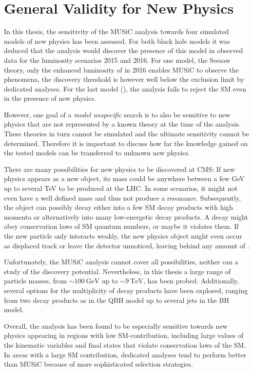 \section{General Validity for New Physics}
In this thesis, the sensitivity of the \ac{MUSiC} analysis towards four simulated models of new physics has been assessed. For both black hole models it was deduced that the analysis would discover the presence of this model in observed data for the luminosity scenarios 2015 and 2016. For one model, the Seesaw theory, only the enhanced luminosity of \lumiB in 2016 enables \ac{MUSiC} to observe the phenomena, the discovery threshold is however well below the exclusion limit by dedicated analyses. For the last model (\PWprime), the analysis fails to reject the \acl{SM} even in the presence of new physics. 

However, one goal of a \emph{model unspecific} search is to also be sensitive to new physics that are not represented by a known theory at the time of the analysis. These theories in turn cannot be simulated and the ultimate sensitivity cannot be determined.
Therefore it is important to discuss how far the knowledge gained on the tested models can be transferred to unknown new physics.

There are many possibilities for new physics to be discovered at \ac{CMS}: If new physics appears as a new object, its mass could be anywhere between a few \si{\GeV} up to several \si{\TeV} to be produced at the \ac{LHC}. In some scenarios, it might not even have a well defined mass and thus not produce a resonance. Subsequently, the object can possibly decay either into a few \ac{SM} decay products with high momenta or alternatively into many low-energetic decay products. A decay might obey conservation laws of \ac{SM} quantum numbers, or maybe it violates them. If the new particle only interacts weakly, the new physics object might even occur as displaced track or leave the detector unnoticed, leaving behind any amount of \MET.

Unfortunately, the \ac{MUSiC} analysis cannot cover all possibilities, neither can a study of the discovery potential.
Nevertheless, in this thesis a large range of particle masses, from $\sim \SI{100}{\GeV}$ up to $\sim \SI{9}{\TeV}$, has been probed. Additionally, several options for the multiplicity of decay products have been explored, ranging from two decay products as in the \ac{QBH} model up to several jets in the \ac{BH} model. 

Overall, the analysis has been found to be especially sensitive towards new physics appearing in regions with low \ac{SM}-contribution, including large values of the kinematic variables and final states that violate conservation laws of the \acl{SM}. In areas with a large \ac{SM} contribution, dedicated analyses tend to perform better than \ac{MUSiC} because of more sophisticated selection strategies.

